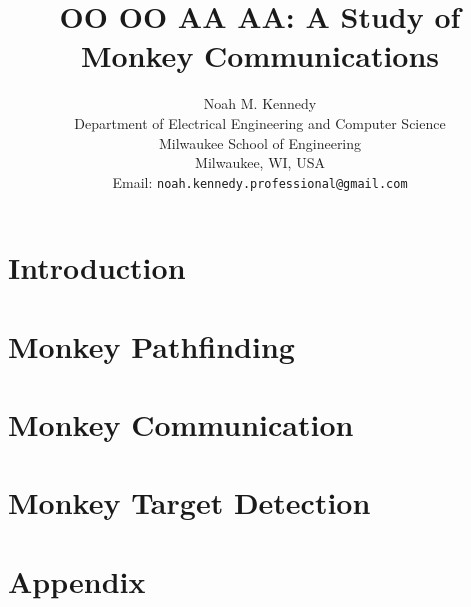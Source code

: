 \documentclass[11pt]{article}
\title{
    OO OO AA AA: A Study of Monkey Communications
}
\author{
    Noah M. Kennedy \\[3pt]
    {\small Department of Electrical Engineering and Computer Science} \\
    {\small Milwaukee School of Engineering} \\
    {\small Milwaukee, WI, USA} \\
    {\small Email: {\tt noah.kennedy.professional@gmail.com}} \\[12pt]
}
\date{}
\begin{document}
    \maketitle

    \abstract
    

    \newpage

    \tableofcontents

    \newpage

    \section{Introduction} \label{sec:intro}
    

    \section{Monkey Pathfinding}\label{sec:monkey-pathfinding}
    

    \section{Monkey Communication}\label{sec:monkey-communication}
    

    \section{Monkey Target Detection}\label{sec:monkey-target-detection}
    

    \section*{Appendix}\label{sec:appendix}

    \pagebreak

    \printbibliography
\end{document}
